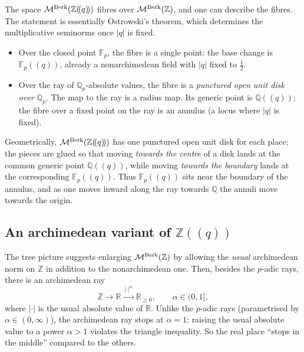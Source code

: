 \begin{remark}
\label{rmk:12:fibres}
The space $\mathcal{M}^{\mathrm{Berk}}(\mathbb{Z}(\!(q)\!))$ fibres over $\mathcal{M}^{\mathrm{Berk}}(\mathbb{Z})$, and one
can describe the fibres. The statement is essentially Ostrowski's theorem, which
determines the multiplicative seminorms once $|q|$ is fixed.
\begin{itemize}
\item Over the closed point $\mathbb{F}_p$, the fibre is a single point: the base
change is $\mathbb{F}_p(\!(q)\!)$, already a nonarchimedean field with $|q|$
fixed to $\tfrac12$.
\item Over the ray of $\mathbb{Q}_p$-absolute values, the fibre is a
\emph{punctured open unit disk over $\mathbb{Q}_p$}. The map to the ray is a
radius map. Its generic point is $\mathbb{Q}(\!(q)\!)$; the fibre over a fixed
point on the ray is an annulus (a locus where $|q|$ is fixed).
\end{itemize}
Geometrically, $\mathcal{M}^{\mathrm{Berk}}(\mathbb{Z}(\!(q)\!))$ has one punctured open unit disk for
each place; the pieces are glued so that moving \emph{towards the centre} of a
disk lands at the common generic point $\mathbb{Q}(\!(q)\!)$, while moving
\emph{towards the boundary} lands at the corresponding $\mathbb{F}_p(\!(q)\!)$.
Thus $\mathbb{F}_p(\!(q)\!)$ sits near the boundary of the annulus, and as one
moves inward along the ray towards $\mathbb{Q}$ the annuli move towards the
origin.
\end{remark}

\subsection{An archimedean variant of \texorpdfstring{$\mathbb{Z}(\!(q)\!)$}{Z((q))}}

The tree picture suggests enlarging $\mathcal{M}^{\mathrm{Berk}}(\mathbb{Z})$ by allowing the
\emph{usual} archimedean norm on $\mathbb{Z}$ in addition to the nonarchimedean
one. Then, besides the $p$-adic rays, there is an archimedean ray
\begin{equation*}
\mathbb{Z}\to\mathbb{R}\xrightarrow{\ |\cdot|^{\alpha}\ }\mathbb{R}_{\ge0},
\qquad \alpha\in(0,1],
\end{equation*}
where $|\cdot|$ is the usual absolute value of $\mathbb{R}$. Unlike the
$p$-adic rays (parametrised by $\alpha\in(0,\infty)$), the archimedean ray stops
at $\alpha=1$: raising the usual absolute value to a power $\alpha>1$ violates
the triangle inequality. So the real place ``stops in the middle'' compared to
the others.

